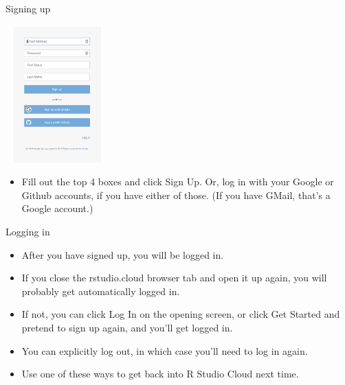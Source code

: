 \documentclass[
  ignorenonframetext,
]{beamer}
\providecommand{\tightlist}{%
  \setlength{\itemsep}{0pt}\setlength{\parskip}{0pt}}
\begin{document}
\begin{frame}{Signing up}
\protect\hypertarget{signing-up}{}

\includegraphics[width=\textwidth,height=2.08333in]{Screenshot_2018-06-29_15-08-57.png}

\begin{itemize}
\tightlist
\item
  Fill out the top 4 boxes and click Sign Up. Or, log in with your
  Google or Github accounts, if you have either of those. (If you have
  GMail, that's a Google account.)
\end{itemize}

\end{frame}

\begin{frame}{Logging in}
\protect\hypertarget{logging-in}{}

\begin{itemize}
\tightlist
\item
  After you have signed up, you will be logged in.
\item
  If you close the rstudio.cloud browser tab and open it up again, you
  will probably get automatically logged in.
\item
  If not, you can click Log In on the opening screen, or click Get
  Started and pretend to sign up again, and you'll get logged in.
\item
  You can explicitly log out, in which case you'll need to log in again.
\item
  Use one of these ways to get back into R Studio Cloud next time.
\end{itemize}

\end{frame}
\end{document}
